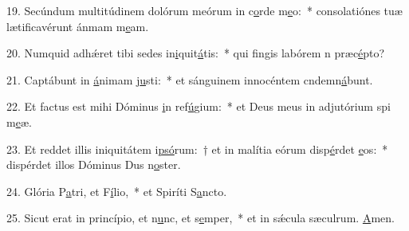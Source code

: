 19. Secúndum multitúdinem dolórum meórum in c\uline{o}rde m\uline{e}o:~* consolatiónes tuæ lætificavérunt ánmam m\uline{e}am.\par 
20. Numquid adhǽret tibi sedes in\uline{i}quit\uline{á}tis:~* qui fingis labórem n præc\uline{é}pto?\par 
21. Captábunt in \uline{á}nimam j\uline{u}sti:~* et sánguinem innocéntem cndemn\uline{á}bunt.\par 
22. Et factus est mihi Dóminus \uline{i}n ref\uline{ú}gium:~* et Deus meus in adjutórium spi m\uline{e}æ.\par 
23. Et reddet illis iniquitátem i\uline{psó}rum:~† et in malítia eórum disp\uline{é}rdet \uline{e}os:~* dispérdet illos Dóminus Dus n\uline{o}ster.\par 
24. Glória P\uline{a}tri, et F\uline{í}lio,~* et Spiríti S\uline{a}ncto.\par 
25. Sicut erat in princípio, et n\uline{u}nc, et s\uline{e}mper,~* et in sǽcula sæculrum. \uline{A}men.\par 
